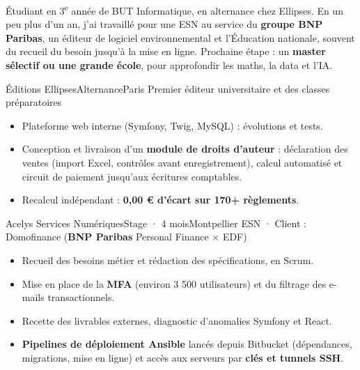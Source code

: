 


\makeheader

\begin{minipage}[t]{\mainwidth}
\raggedright

Étudiant en 3\textsuperscript{e} année de BUT Informatique, en alternance chez Ellipses. En un peu plus
d'un an, j'ai travaillé pour une ESN au service du \textbf{groupe BNP Paribas}, un éditeur de logiciel
environnemental et l'Éducation nationale, souvent du recueil du besoin jusqu'à la mise en ligne.
Prochaine étape : un \textbf{master sélectif ou une grande école}, pour approfondir les maths, la data et l'IA.
\keyfigures


  {Éditions Ellipses}{Alternance}{Paris}
  {Premier éditeur universitaire et des classes préparatoires}
\begin{itemize}
  \item Plateforme web interne (Symfony, Twig, MySQL) : évolutions et tests.
  \item Conception et livraison d'un \textbf{module de droits d'auteur} : déclaration des ventes (import Excel, contrôles avant enregistrement), calcul automatisé et circuit de paiement jusqu'aux écritures comptables.
  \item Recalcul indépendant : \textbf{0,00 € d'écart sur 170+ règlements}.
\end{itemize}

  {Acelys Services Numériques}{Stage · 4 mois}{Montpellier}
  {ESN · Client : Domofinance (\textbf{\color{ink}BNP Paribas} Personal Finance × EDF)}
\begin{itemize}
  \item Recueil des besoins métier et rédaction des spécifications, en Scrum.
  \item Mise en place de la \textbf{MFA} (environ 3 500 utilisateurs) et du filtrage des e-mails transactionnels.
  \item Recette des livrables externes, diagnostic d'anomalies Symfony et React.
  \item \textbf{Pipelines de déploiement Ansible} lancés depuis Bitbucket (dépendances, migrations, mise en ligne) et accès aux serveurs par \textbf{clés et tunnels SSH}.
\end{itemize}


\end{minipage}
